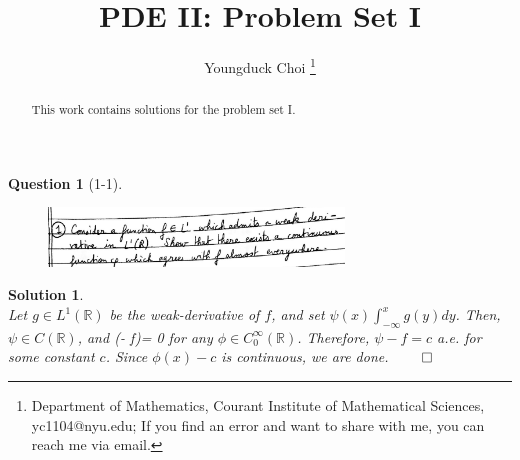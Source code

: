 \documentclass[11pt]{article}
\date{}
\title{\vspace{-0.7cm}
PDE II: Problem Set I}
\author{
Youngduck Choi 
\thanks{Department of Mathematics, Courant Institute of Mathematical Sciences, 
yc1104@nyu.edu; If you find an error and want to share with me, 
you can reach me via email.
}}
\theoremstyle{plain}
\def\eQb#1\eQe{\begin{eqnarray*}#1\end{eqnarray*}}
\theoremstyle{quest}
\newtheorem*{question}{Question}
\newtheorem*{solution}{Solution}
\begin{document}
\maketitle

\begin{abstract}
This work contains solutions for the problem set I.
\end{abstract}


\begin{question}[1-1]
\hfill
\begin{figure}[h!]
  \centering
    \includegraphics[width=0.7\textwidth]{pde2-s2-p1.png}
\end{figure}
\end{question}
\begin{solution} \hfill \\
Let $g \in L^1(\mathbb{R})$ be the weak-derivative of $f$, and set
$\psi(x) \int_{-\infty}^{x} g(y) dy$. Then, $\psi \in C(\mathbb{R})$, and 
\eQb
\int(\psi - f)\phi = 0
\eQe
for any $\phi \in C_0^{\infty}(\mathbb{R})$. Therefore, $\psi - f = c$ a.e.
for some constant $c$. Since $\phi(x) - c$ is continuous, we are done. \hfill 
$\qed$
\end{solution}

\newpage
\end{document}
